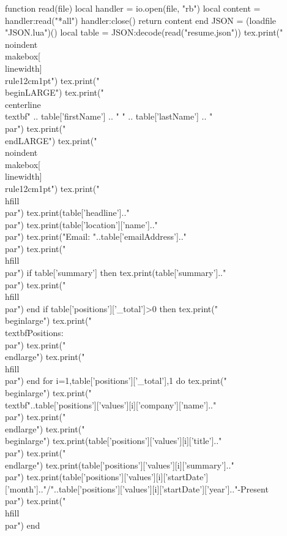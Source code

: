 \documentclass{article}
\begin{document}
\begin{luacode}
function read(file)
    local handler = io.open(file, "rb")
    local content = handler:read("*all")
    handler:close()
    return content
end
JSON = (loadfile "JSON.lua")()
local table = JSON:decode(read("resume.json"))
tex.print("\\noindent\\makebox[\\linewidth]{\\rule{12cm}{1pt}}")
tex.print("\\begin{LARGE}")
tex.print("\\centerline {\\textbf{" .. table['firstName'] .. " " .. table['lastName'] .. "}}\\par")
tex.print("\\end{LARGE}")
tex.print("\\noindent\\makebox[\\linewidth]{\\rule{12cm}{1pt}}")
tex.print("\\hfill\\par")
tex.print(table['headline'].."\\par")
tex.print(table['location']['name'].."\\par")
tex.print("Email: "..table['emailAddress'].."\\par")
tex.print("\\hfill\\par")
if table['summary'] then
  tex.print(table['summary'].."\\par")
  tex.print("\\hfill\\par")
end
if table['positions']['_total']>0 then
  tex.print("\\begin{large}")
  tex.print("\\textbf{Positions:}\\par")
  tex.print("\\end{large}")
  tex.print("\\hfill\\par")
end
for i=1,table['positions']['_total'],1 do
  tex.print("\\begin{large}")
  tex.print("\\textbf{"..table['positions']['values'][i]['company']['name'].."}\\par")
  tex.print("\\end{large}")
  tex.print("\\begin{large}")
  tex.print(table['positions']['values'][i]['title'].."\\par")
  tex.print("\\end{large}")
  tex.print(table['positions']['values'][i]['summary'].."\\par")
  tex.print(table['positions']['values'][i]['startDate']['month'].."/"..table['positions']['values'][i]['startDate']['year'].."-Present\\par")
  tex.print("\\hfill\\par")
end

\end{luacode}
\end{document}
